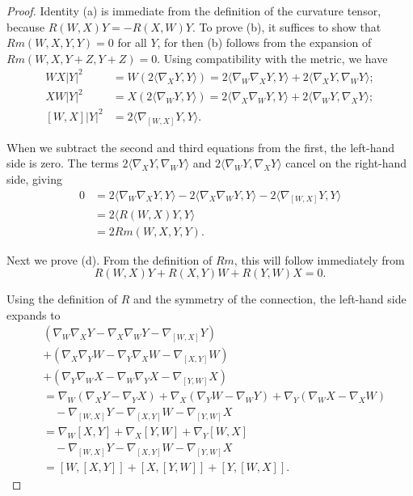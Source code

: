 \begin{proof}
Identity (a) is immediate from the definition of the curvature tensor, because $R(W, X)Y = -R(X, W)Y$. To prove (b), it suffices to show that $Rm(W, X, Y, Y) = 0$ for all $Y$, for then (b) follows from the expansion of $Rm(W, X, Y + Z, Y + Z) = 0$. Using compatibility with the metric, we have
\begin{align*}
WX|Y|^2 &= W(2\langle\nabla_X Y, Y\rangle) = 2\langle\nabla_W \nabla_X Y, Y\rangle + 2\langle\nabla_X Y, \nabla_W Y\rangle; \\
XW|Y|^2 &= X(2\langle\nabla_W Y, Y\rangle) = 2\langle\nabla_X \nabla_W Y, Y\rangle + 2\langle\nabla_W Y, \nabla_X Y\rangle; \\
[W, X]|Y|^2 &= 2\langle\nabla_{[W,X]} Y, Y\rangle.
\end{align*}

When we subtract the second and third equations from the first, the left-hand side is zero. The terms $2\langle\nabla_X Y, \nabla_W Y\rangle$ and $2\langle\nabla_W Y, \nabla_X Y\rangle$ cancel on the right-hand side, giving
\begin{align*}
0 &= 2\langle\nabla_W \nabla_X Y, Y\rangle - 2\langle\nabla_X \nabla_W Y, Y\rangle - 2\langle\nabla_{[W,X]} Y, Y\rangle \\
&= 2\langle R(W, X)Y, Y\rangle \\
&= 2Rm(W, X, Y, Y).
\end{align*}

Next we prove (d). From the definition of $Rm$, this will follow immediately from
$$R(W, X)Y + R(X, Y)W + R(Y, W)X = 0.$$

Using the definition of $R$ and the symmetry of the connection, the left-hand side expands to
\begin{align*}
&(\nabla_W \nabla_X Y - \nabla_X \nabla_W Y - \nabla_{[W,X]} Y) \\
&+ (\nabla_X \nabla_Y W - \nabla_Y \nabla_X W - \nabla_{[X,Y]} W) \\
&+ (\nabla_Y \nabla_W X - \nabla_W \nabla_Y X - \nabla_{[Y,W]} X) \\
&= \nabla_W (\nabla_X Y - \nabla_Y X) + \nabla_X (\nabla_Y W - \nabla_W Y) + \nabla_Y (\nabla_W X - \nabla_X W) \\
&\quad - \nabla_{[W,X]} Y - \nabla_{[X,Y]} W - \nabla_{[Y,W]} X \\
&= \nabla_W [X, Y] + \nabla_X [Y, W] + \nabla_Y [W, X] \\
&\quad - \nabla_{[W,X]} Y - \nabla_{[X,Y]} W - \nabla_{[Y,W]} X \\
&= [W, [X, Y]] + [X, [Y, W]] + [Y, [W, X]].
\end{align*}


\end{proof}
